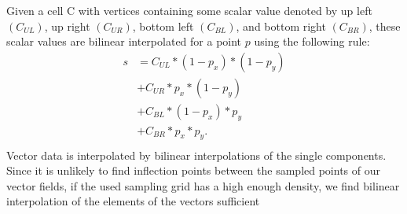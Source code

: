 Given a cell C with vertices containing some scalar value denoted by up left $(C_{UL})$, up right $(C_{UR})$, bottom left $(C_{BL})$, and bottom right $(C_{BR})$, these scalar values are bilinear interpolated for a point $p$ using the following rule:
\begin{align*}
	s & = C_{UL} * (1 - p_x ) * (1 - p_y) \\
		& +	C_{UR} *  p_x  * (1 - p_y) \\
		& +	C_{BL} *  (1 - p_x ) * p_y \\
		& +	C_{BR} *  p_x  * p_y. \\
\end{align*}
Vector data is interpolated by bilinear interpolations of the single components. Since it is unlikely to find inflection points between the sampled points of our vector fields, if the used sampling grid has a high enough density, we find bilinear interpolation of the elements of the vectors sufficient


